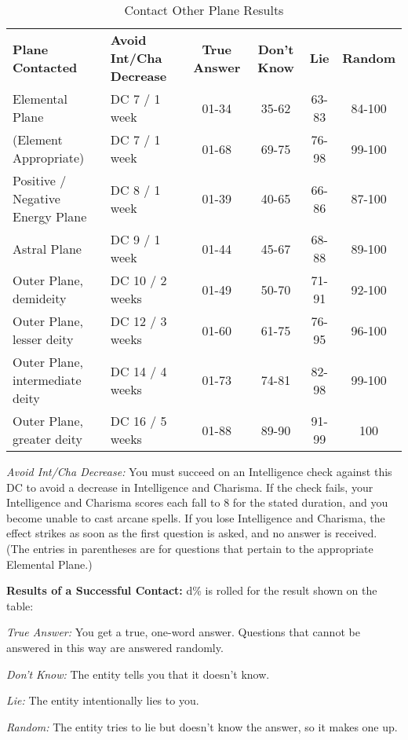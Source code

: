 \begin{table}[htb]
\caption{Contact Other Plane Results}
\centering
\begin{tabular}{l l cccc}
\textbf{Plane Contacted} & \textbf{Avoid Int/Cha Decrease} & \textbf{True Answer} & \textbf{Don't Know} & \textbf{Lie} & \textbf{Random}\\
Elemental Plane & DC 7 / 1 week & 01-34 & 35-62 & 63-83 & 84-100\\
(Element Appropriate) & DC 7 / 1 week & 01-68 & 69-75 & 76-98 & 99-100\\
Positive / Negative Energy Plane & DC 8 / 1 week & 01-39 & 40-65 & 66-86 & 87-100\\
Astral Plane & DC 9 / 1 week & 01-44 & 45-67 & 68-88 & 89-100\\
Outer Plane, demideity & DC 10 / 2 weeks & 01-49 & 50-70 & 71-91 & 92-100\\
Outer Plane, lesser deity & DC 12 / 3 weeks & 01-60 & 61-75 & 76-95 & 96-100\\
Outer Plane, intermediate deity & DC 14 / 4 weeks & 01-73 & 74-81 & 82-98 & 99-100\\
Outer Plane, greater deity & DC 16 / 5 weeks & 01-88 & 89-90 & 91-99 & 100\\
\end{tabular}
\end{table}

\textit{Avoid Int/Cha Decrease:} You must succeed on an Intelligence check against 
this DC to avoid a decrease in Intelligence and Charisma. If the check fails, your 
Intelligence and Charisma scores each fall to 8 for the stated duration, and you 
become unable to cast arcane spells. If you lose Intelligence and Charisma, the 
effect strikes as soon as the first question is asked, and no answer is received. 
(The entries in parentheses are for questions that pertain to the appropriate Elemental 
Plane.)

\textbf{Results of a Successful Contact:} d\% is rolled for the result shown on 
the table:

\textit{True Answer:} You get a true, one-word answer. Questions that cannot be 
answered in this way are answered randomly.

\textit{Don't Know:} The entity tells you that it doesn't know.

\textit{Lie:} The entity intentionally lies to you.

\textit{Random:} The entity tries to lie but doesn't know the answer, so 
it makes one up.

